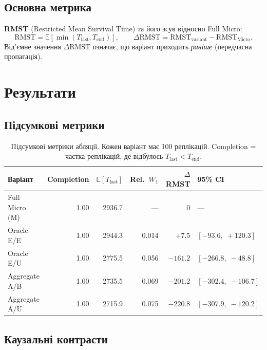 \documentclass[11pt,a4paper]{article}
\begin{document}
\subsection{Основна метрика}

\textbf{RMST} (Restricted Mean Survival Time) та його зсув відносно Full Micro:
\[
  \mathrm{RMST} = \mathbb{E}[\min(T_{\mathrm{last}}, T_{\mathrm{end}})],
  \qquad
  \Delta\mathrm{RMST} = \mathrm{RMST}_{\mathrm{variant}} - \mathrm{RMST}_{\mathrm{Micro}}.
\]
Від'ємне значення $\Delta\mathrm{RMST}$ означає, що варіант приходить
\emph{раніше} (передчасна пропагація).

\section{Результати}

\subsection{Підсумкові метрики}

\begin{table}[H]
\centering
\begin{tabular}{lrrrrl}
\toprule
Варіант & Completion & $\mathbb{E}[T_{\mathrm{last}}]$ & Rel.\ $W_1$ & $\Delta$RMST & 95\% CI \\
\midrule
Full Micro (M)   & 1.00 & 2936.7 & --- & 0     & --- \\
Oracle E/E       & 1.00 & 2944.3 & 0.014 & +7.5  & $[-93.6,\;+120.3]$ \\
Oracle E/U       & 1.00 & 2775.5 & 0.056 & $-161.2$ & $[-266.8,\;-48.8]$ \\
Aggregate A/B    & 1.00 & 2735.5 & 0.069 & $-201.2$ & $[-302.4,\;-106.7]$ \\
Aggregate A/U    & 1.00 & 2715.9 & 0.075 & $-220.8$ & $[-307.9,\;-120.2]$ \\
\bottomrule
\end{tabular}
\caption{Підсумкові метрики абляції. Кожен варіант має 100 реплікацій.
Completion = частка реплікацій, де відбулось $T_{\mathrm{last}} < T_{\mathrm{end}}$.}
\end{table}

\subsection{Каузальні контрасти}
\end{document}

